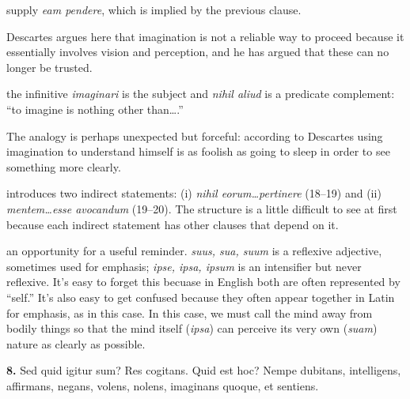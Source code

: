 supply \textit{eam pendere}, which is implied by the previous clause.

 Descartes argues here that imagination is not a reliable way to proceed because it essentially involves vision and perception, and he has argued that these can no longer be trusted.

 the infinitive \textit{imaginari} is the subject and \textit{nihil aliud} is a predicate complement: ``to imagine is nothing other than\dots.''

 The analogy is perhaps unexpected but forceful: according to Descartes using imagination to understand himself is as foolish as going to sleep in order to see something more clearly.

 introduces two indirect statements: (i) \textit{nihil eorum\dots pertinere} (18--19) and (ii) \textit{mentem\dots esse avocandum} (19--20). The structure is a little difficult to see at first because each indirect statement has other clauses that depend on it.

 an opportunity for a useful reminder. \textit{suus, sua, suum} is a reflexive adjective, sometimes used for emphasis; \textit{ipse, ipsa, ipsum} is an intensifier but never reflexive. It's easy to forget this becuase in English both are often represented by ``self.'' It's also easy to get confused because they often appear together in Latin for emphasis, as in this case. In this case, we must call the mind away from bodily things so that the mind itself (\textit{ipsa}) can perceive its very own (\textit{suam}) nature as clearly as possible.

\clearpage

\beginnumbering
\pstart
\begin{latin}
    \textenglish{\textbf{8.}} Sed quid igitur sum? Res cogitans. Quid est hoc? Nempe dubitans, intelligens, affirmans, negans, volens, nolens, imaginans quoque, et sentiens.
\end{latin}
\pend
\endnumbering

